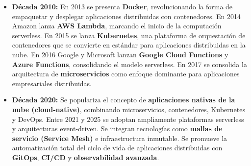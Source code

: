 \documentclass[a4paper,12pt]{article}
\begin{document}
\begin{itemize}
    \item \textbf{Década 2010:} En 2013 se presenta \textbf{Docker}, revolucionando la forma de empaquetar y desplegar aplicaciones distribuidas con contenedores. En 2014 Amazon lanza \textbf{AWS Lambda}, marcando el inicio de la computación serverless. En 2015 se lanza \textbf{Kubernetes}, una plataforma de orquestación de contenedores que se convierte en estándar para aplicaciones distribuidas en la nube. En 2016 Google y Microsoft lanzan \textbf{Google Cloud Functions} y \textbf{Azure Functions}, consolidando el modelo serverless. En 2017 se consolida la arquitectura de \textbf{microservicios} como enfoque dominante para aplicaciones empresariales distribuidas.
    
    \item \textbf{Década 2020:} Se populariza el concepto de \textbf{aplicaciones nativas de la nube (cloud-native)}, combinando microservicios, contenedores, Kubernetes y DevOps. Entre 2021 y 2025 se adoptan ampliamente plataformas serverless y arquitecturas event-driven. Se integran tecnologías como \textbf{mallas de servicio (Service Mesh)} e infraestructura inmutable. Se promueve la automatización total del ciclo de vida de aplicaciones distribuidas con \textbf{GitOps}, \textbf{CI/CD} y \textbf{observabilidad avanzada}.
\end{itemize}
\end{document}
